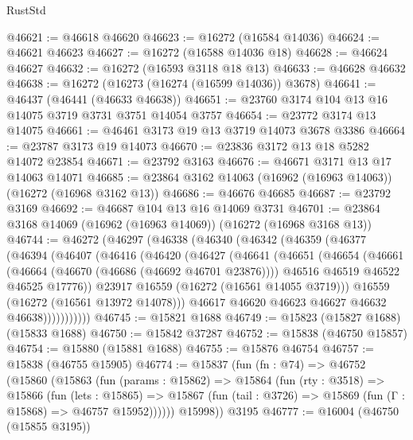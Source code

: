 \begin{lexlean}{RustStd}
\begin{coremodule}
@46621 := @46618 @46620
@46623 := @16272 (@16584 @14036)
@46624 := @46621 @46623
@46627 := @16272 (@16588 @14036 @18)
@46628 := @46624 @46627
@46632 := @16272 (@16593 @3118 @18 @13)
@46633 := @46628 @46632
@46638 := @16272 (@16273 (@16274 (@16599 @14036)) @3678)
@46641 := @46437 (@46441 (@46633 @46638))
@46651 := @23760 @3174 @104 @13 @16 @14075 @3719 @3731 @3751 @14054 @3757
@46654 := @23772 @3174 @13 @14075
@46661 := @46461 @3173 @19 @13 @3719 @14073 @3678 @3386
@46664 := @23787 @3173 @19 @14073
@46670 := @23836 @3172 @13 @18 @5282 @14072 @23854
@46671 := @23792 @3163
@46676 := @46671 @3171 @13 @17 @14063 @14071
@46685 := @23864 @3162 @14063 (@16962 (@16963 @14063)) (@16272 (@16968 @3162 @13))
@46686 := @46676 @46685
@46687 := @23792 @3169
@46692 := @46687 @104 @13 @16 @14069 @3731
@46701 := @23864 @3168 @14069 (@16962 (@16963 @14069)) (@16272 (@16968 @3168 @13))
@46744 := @46272
    (@46297
      (@46338
        (@46340
          (@46342
            (@46359
              (@46377
                (@46394
                  (@46407
                    (@46416
                      (@46420
                        (@46427
                          (@46641
                            (@46651
                              (@46654
                                (@46661
                                  (@46664 (@46670 (@46686 (@46692 @46701 @23876))))
                                  @46516
                                  @46519
                                  @46522
                                  @46525
                                  @17776))
                              @23917
                              @16559
                              (@16272 (@16561 @14055 @3719)))
                            @16559
                            (@16272 (@16561 @13972 @14078)))
                          @46617
                          @46620
                          @46623
                          @46627
                          @46632
                          @46638)))))))))))
@46745 := @15821 @1688
@46749 := @15823 (@15827 @1688) (@15833 @1688)
@46750 := @15842 @37287
@46752 := @15838 (@46750 @15857)
@46754 := @15880 (@15881 @1688)
@46755 := @15876 @46754
@46757 := @15838 (@46755 @15905)
@46774 := @15837
    (fun (fn : @74) =>
    @46752
      (@15860
        (@15863
          (fun (params : @15862) =>
          @15864
            (fun (rty : @3518) =>
            @15866
              (fun (lets : @15865) =>
              @15867 (fun (tail : @3726) => @15869 (fun (Γ : @15868) => @46757 @15952))))))
        @15998))
    @3195
@46777 := @16004 (@46750 (@15855 @3195))

\end{coremodule}
\end{lexlean}
